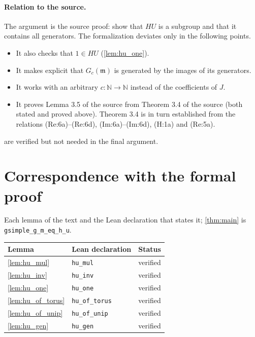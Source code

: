 \documentclass[11pt]{article}
\theoremstyle{definition}
\theoremstyle{remark}
\newcommand{\Gm}{G_c(\mathfrak{m})}
\begin{document}
\paragraph{Relation to the source.}
The argument is the source proof: show that $HU$ is a subgroup and that it contains all generators. The formalization deviates only in the following points.
\begin{itemize}
\item It also checks that $1\in HU$ (\cref{lem:hu_one}).
\item It makes explicit that $\Gm$ is generated by the images of its generators.
\item It works with an arbitrary $c\colon\mathbb{N}\to\mathbb{N}$ instead of the coefficients of $J$.
\item It proves Lemma 3.5 of the source from Theorem 3.4 of the source (both stated and proved above). Theorem 3.4 is in turn established from the relations (Re:6a)--(Re:6d), (Im:6a)--(Im:6d), (H:1a) and (Re:5a).
\end{itemize}
 are verified but not needed in the final argument.

\appendix
\section{Correspondence with the formal proof}
Each lemma of the text and the Lean declaration that states it; \cref{thm:main} is \texttt{gsimple\_g\_m\_eq\_h\_u}.

\begin{longtable}{@{}lll@{}}
\toprule
Lemma & Lean declaration & Status \\
\midrule
\endhead
\cref{lem:hu_mul} & \texttt{hu\_mul} & verified \\
\cref{lem:hu_inv} & \texttt{hu\_inv} & verified \\
\cref{lem:hu_one} & \texttt{hu\_one} & verified \\
\cref{lem:hu_of_torus} & \texttt{hu\_of\_torus} & verified \\
\cref{lem:hu_of_unip} & \texttt{hu\_of\_unip} & verified \\
\cref{lem:hu_gen} & \texttt{hu\_gen} & verified \\
\bottomrule
\end{longtable}
\end{document}
